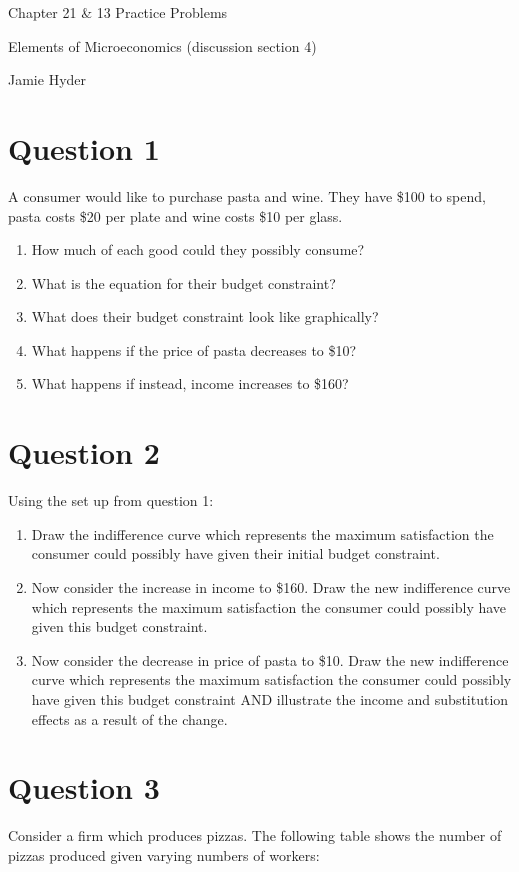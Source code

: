 \documentclass[12pt]{article}
\begin{document}
\begin{center}
\Large Chapter 21 \& 13 Practice Problems

\medskip

\normalsize Elements of Microeconomics (discussion section 4)

\medskip

\small Jamie Hyder
\end{center}

\section*{Question 1}
A consumer would like to purchase pasta and wine. They have \$100 to spend, pasta costs \$20 per plate and wine costs \$10 per glass.
\begin{enumerate}
    \item How much of each good could they possibly consume?
    \item What is the equation for their budget constraint?
    \item What does their budget constraint look like graphically?
    \item What happens if the price of pasta decreases to \$10?
    \item What happens if instead, income increases to \$160?
\end{enumerate}

\section*{Question 2}
Using the set up from question 1:
\begin{enumerate}
    \item Draw the indifference curve which represents the maximum satisfaction the consumer could possibly have given their initial budget constraint.
    \item Now consider the increase in income to \$160. Draw the new indifference curve which represents the maximum satisfaction the consumer could possibly have given this budget constraint.
    \item Now consider the decrease in price of pasta to \$10. Draw the new indifference curve which represents the maximum satisfaction the consumer could possibly have given this budget constraint AND illustrate the income and substitution effects as a result of the change. 
\end{enumerate}



\section*{Question 3}
     Consider a firm which produces pizzas. The following table shows the number of pizzas produced given varying numbers of workers:
    
\end{document}
